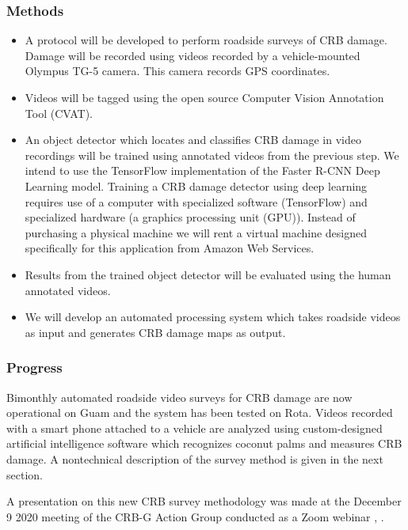 \documentclass[12pt,letterpaper,english,bibliography=totocnumbered,abstract=on]{scrartcl}
\begin{document}
\begin{framed}
\subsubsection{Methods}

\begin{itemize}
	\item A protocol will be developed to perform roadside surveys of CRB damage. Damage will be recorded using videos recorded by a vehicle-mounted Olympus TG-5 camera. This camera records GPS coordinates.
	\item Videos will be tagged using the open source Computer Vision Annotation Tool (CVAT).
	\item An object detector which locates and classifies CRB damage in video recordings will be trained using annotated videos from the previous step. We intend to use the TensorFlow implementation of the Faster R-CNN Deep Learning model. Training a CRB damage detector using deep learning requires use of a computer with specialized software (TensorFlow) and specialized hardware (a graphics processing unit (GPU)). Instead of purchasing a physical machine we will rent a virtual machine designed specifically for this application from Amazon Web Services.
	\item Results from the trained object detector will be evaluated using the human annotated videos.
	\item We will develop an automated processing system which takes roadside videos as input and generates CRB damage maps as output.
\end{itemize}
\end{framed}

\subsubsection{Progress}

Bimonthly automated roadside video surveys for CRB damage are now operational on Guam and the system has been tested on Rota. Videos recorded with a smart phone attached to a vehicle are analyzed using custom-designed artificial intelligence software which recognizes coconut palms and measures CRB damage. A nontechnical description of the survey method is given in the next section.

A presentation on this new CRB survey methodology was made at the December 9 2020 meeting of the CRB-G Action Group conducted as a Zoom webinar \cite{mooreVideoRecordingCRBG2020}, \cite{mooreAutomatedRoadsideVideo2020}.
\end{document}
